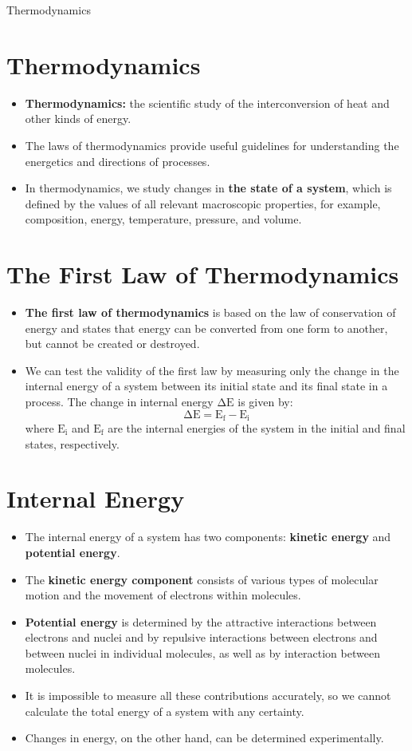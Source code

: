 \documentclass[a4paper,12pt,twocolumn]{article}
\begin{document}
\begin{center}
    \huge{Thermodynamics} 
\end{center}

\section{Thermodynamics}
\begin{itemize}
\item \textbf{Thermodynamics:} the scientific study of the interconversion of heat and other kinds of energy.
\item The laws of thermodynamics provide useful guidelines for understanding the energetics and directions of processes. 
\item In thermodynamics, we study changes in \textbf{the state of a system}, which is defined by the values of all relevant macroscopic properties, for example, composition, energy, temperature, pressure, and volume.
\end{itemize}

\section{The First Law of Thermodynamics}
\begin{itemize}
\item \textbf{The first law of thermodynamics} is based on the law of conservation of energy and states that energy can be converted from one form to another, but cannot be created or destroyed.
\item We can test the validity of the first law by measuring only the change in the internal energy of a system between its initial state and its final state in a process. The change in internal energy $\mathrm{\Delta E}$ is given by:
$$\mathrm{\Delta E = E_f - E_i}$$
where $\mathrm{E_i}$ and $\mathrm{E_f}$ are the internal energies of the system in the initial and final states, respectively.
\end{itemize}

\section{Internal Energy}
\begin{itemize}
\item The internal energy of a system has two components: \textbf{kinetic energy} and \textbf{potential energy}. 
\item The \textbf{kinetic energy component} consists of various types of molecular motion and the movement of electrons within molecules. 
\item \textbf{Potential energy} is determined by the attractive interactions between electrons and nuclei and by repulsive interactions between electrons and between nuclei in individual molecules, as well as by interaction between molecules. 
\item It is impossible to measure all these contributions accurately, so we cannot calculate the total energy of a system with any certainty.
\item Changes in energy, on the other hand, can be determined experimentally. 
\end{itemize}
\end{document}
